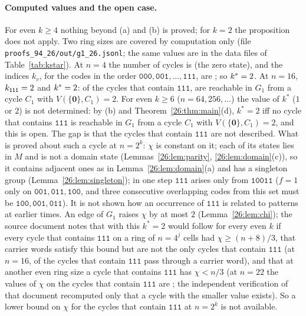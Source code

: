 \documentclass[10pt,a4paper]{article}
\newcommand{\zero}{\mathbf{0}}                %
\newcommand{\Gone}{G_1}                       %
\newcommand{\kst}{k^{*}}
\newcommand{\code}[1]{\mathtt{#1}}            %
\begin{document}
\paragraph{Computed values and the open case.}
For even $k\ge4$ nothing beyond (a) and (b) is proved; for $k=2$ the proposition does not apply. Two ring sizes are covered by computation only (file \texttt{proofs\_94\_26/out/g1\_26.jsonl}; the same values are
in the data files of Table~\ref{tab:kstar}). At $n=4$ the number of cycles is \TwentySixFourCycles{} (the zero
state), and the indices $k_v$, for the codes in the order $\code{000},\code{001},\dots,\code{111}$, are
\TwentySixFourKv; so $\kst=\KstarTwentySixAtFour$. At $n=16$, $k_{\code{111}}=\KsevenTwentySixAtSixteen$ and
$\kst=\KstarTwentySixAtSixteen$: of the \TwentySixSixteenWith{} cycles that contain $\code{111}$,
\TwentySixSixteenReach{} are reachable in $\Gone$ from a cycle $C_1$ with $V(\{\zero\},C_1)=2$.
For even $k\ge6$ ($n=64,256,\dots$) the value of $\kst$ ($1$ or $2$) is not determined: by (b) and
Theorem~\ref{26:thm:main}(d), $\kst=2$ iff no cycle that contains $\code{111}$ is reachable in $\Gone$ from a cycle
$C_1$ with $V(\{\zero\},C_1)=2$, and this is open. The gap is that the cycles that contain $\code{111}$ are not
described. What is proved about such a cycle at $n=2^k$: $\chi$ is constant on it; each of its states lies in $M$ and
is not a domain state (Lemmas~\ref{26:lem:parity}, \ref{26:lem:domain}(c)), so it contains adjacent ones as in
Lemma~\ref{26:lem:domain}(a) and has a singleton group (Lemma~\ref{26:lem:singleton}); in one step $\code{111}$ arises
only from $\code{10011}$ ($f=1$ only on $\code{001},\code{011},\code{100}$, and three consecutive overlapping codes
from this set must be $\code{100},\code{001},\code{011}$). It is not shown how an occurrence of $\code{111}$ is related
to patterns at earlier times. An edge of $\Gone$ raises $\chi$ by at most $2$ (Lemma~\ref{26:lem:chi}); the source
document notes that with this $\kst=2$ would follow for every even $k$ if every cycle that contains $\code{111}$ on a
ring of $n=4^j$ cells had $\chi\ge(n+8)/3$, that carrier words satisfy this bound but are not the only cycles that
contain $\code{111}$
(at $n=16$, \TwentySixSixteenCarrier{} of the \TwentySixSixteenWith{} cycles that contain $\code{111}$ pass through
a carrier word),
and that at another even ring size a cycle that contains $\code{111}$ has $\chi<n/3$
(at $n=22$ the values of $\chi$ on the cycles that contain $\code{111}$ are \TwentySixTwentyTwoChi; the independent
verification of that document recomputed only that a cycle with the smaller value exists). So a lower bound on $\chi$ for the cycles that contain
$\code{111}$ at $n=2^k$ is not available.
\end{document}
